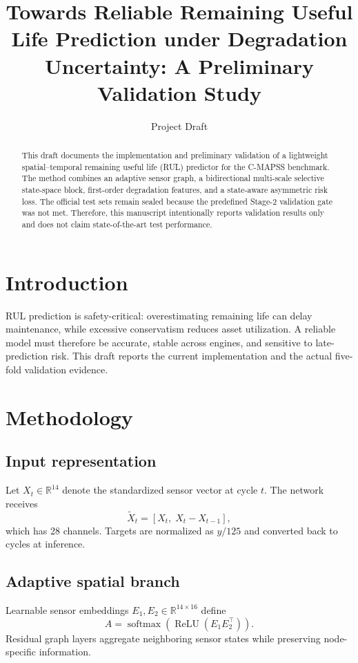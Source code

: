 \documentclass[conference]{IEEEtran}
\title{Towards Reliable Remaining Useful Life Prediction under Degradation Uncertainty: A Preliminary Validation Study}
\author{Project Draft}
\begin{document}
\maketitle

\begin{abstract}
This draft documents the implementation and preliminary validation of a lightweight spatial--temporal remaining useful life (RUL) predictor for the C-MAPSS benchmark. The method combines an adaptive sensor graph, a bidirectional multi-scale selective state-space block, first-order degradation features, and a state-aware asymmetric risk loss. The official test sets remain sealed because the predefined Stage-2 validation gate was not met. Therefore, this manuscript intentionally reports validation results only and does not claim state-of-the-art test performance.
\end{abstract}

\section{Introduction}
RUL prediction is safety-critical: overestimating remaining life can delay maintenance, while excessive conservatism reduces asset utilization. A reliable model must therefore be accurate, stable across engines, and sensitive to late-prediction risk. This draft reports the current implementation and the actual five-fold validation evidence.

\section{Methodology}
\subsection{Input representation}
Let $X_t\in\mathbb{R}^{14}$ denote the standardized sensor vector at cycle $t$. The network receives
\begin{equation}
\tilde X_t = [X_t,\; X_t-X_{t-1}],
\end{equation}
which has 28 channels. Targets are normalized as $y/125$ and converted back to cycles at inference.

\subsection{Adaptive spatial branch}
Learnable sensor embeddings $E_1,E_2\in\mathbb{R}^{14\times16}$ define
\begin{equation}
A=\operatorname{softmax}\!\left(\operatorname{ReLU}(E_1E_2^\top)\right).
\end{equation}
Residual graph layers aggregate neighboring sensor states while preserving node-specific information.
\end{document}
